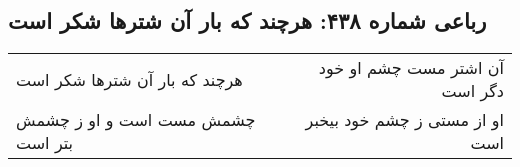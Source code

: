\begin{center}
\section*{رباعی شماره ۴۳۸: هرچند که بار آن شترها شکر است}
\label{sec:0438}
\begin{longtable}{l p{0.5cm} r}
هرچند که بار آن شترها شکر است
&&
آن اشتر مست چشم او خود دگر است
\\
چشمش مست است و او ز چشمش بتر است
&&
او از مستی ز چشم خود بیخبر است
\\
\end{longtable}
\end{center}
